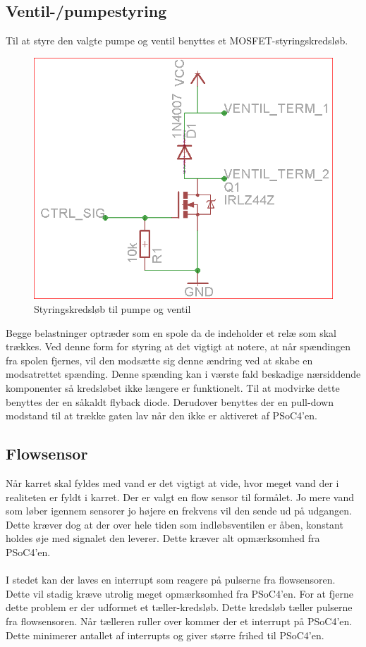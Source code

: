 \subsection{Ventil-/pumpestyring}
Til at styre den valgte pumpe og ventil benyttes et MOSFET-styringskredsløb. 

\begin{figure}[H]
	\centering
	\includegraphics[scale=0.25]{../Hardware/Ventilstyring/Screenshots/VentilStyringskreds}
	\caption{Styringskredsløb til pumpe og ventil}
	\label{screenshot:ventilStyringskreds}
\end{figure}

Begge belastninger optræder som en spole da de indeholder et relæ som skal trækkes. Ved denne form for styring at det vigtigt at notere, at når spændingen fra spolen fjernes, vil den modsætte sig denne ændring ved at skabe en modsatrettet spænding. Denne spænding kan i værste fald beskadige nærsiddende komponenter så kredsløbet ikke længere er funktionelt. Til at modvirke dette benyttes der en såkaldt flyback diode. Derudover benyttes der en pull-down modstand til at trække gaten lav når den ikke er aktiveret af PSoC4'en.

\subsection{Flowsensor}
Når karret skal fyldes med vand er det vigtigt at vide, hvor meget vand der i realiteten er fyldt i karret. Der er valgt en flow sensor til formålet. Jo mere vand som løber igennem sensorer jo højere en frekvens vil den sende ud på udgangen. Dette kræver dog at der over hele tiden som indløbsventilen er åben, konstant holdes øje med signalet den leverer. Dette kræver alt opmærksomhed fra PSoC4'en. 
\\\\
I stedet kan der laves en interrupt som reagere på pulserne fra flowsensoren. Dette vil stadig kræve utrolig meget opmærksomhed fra PSoC4'en. For at fjerne dette problem er der udformet et tæller-kredsløb. Dette kredsløb tæller pulserne fra flowsensoren. Når tælleren ruller over kommer der et interrupt på PSoC4'en. Dette minimerer antallet af interrupts og giver større frihed til PSoC4'en.

